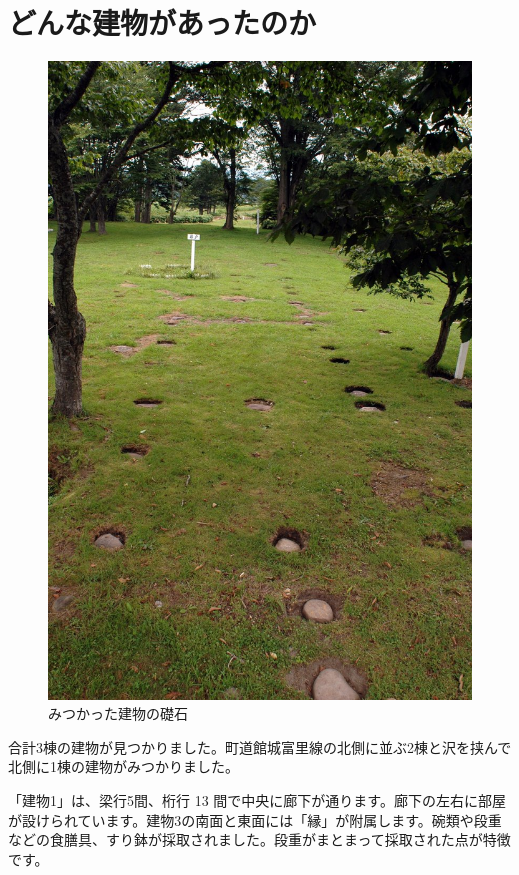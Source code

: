 \documentclass[11pt,report]{jsbook}
\begin{document}
\section{どんな建物があったのか}
\begin{figure}
\vspace*{-\intextsep} 
\centering
\includegraphics[width=15zw]{fig/15.JPG}
\caption{みつかった建物の礎石}
\label{fig15}
\end{figure}

合計3棟の建物が見つかりました。町道館城富里線の北側に並ぶ2棟と沢を挟んで北側に1棟の建物がみつかりました。

「建物1」は、梁行5間、桁行 13 間で中央に廊下が通ります。廊下の左右に部屋が設けられています。建物3の南面と東面には「縁」が附属します。碗類や段重などの食膳具、すり鉢が採取されました。段重がまとまって採取された点が特徴です。
\end{document}
